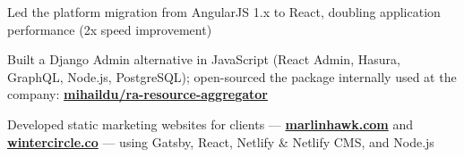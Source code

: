 \documentclass[]{plushcv}
\begin{document}
\begin{minipage}[t]{0.70\textwidth}
\begin{tightemize}
\sectionsep
\item Led the platform migration from AngularJS 1.x to React, doubling application performance (2x speed improvement)
\item Built a Django Admin alternative in JavaScript (React Admin, Hasura, GraphQL, Node.js, PostgreSQL); open-sourced the package internally used at the company: \href{https://github.com/mihaildu/ra-resource-aggregator}{\textbf{mihaildu/ra-resource-aggregator}}
\item Developed static marketing websites for clients — \href{https://www.marlinhawk.com/}{\textbf{marlinhawk.com}} and \href{https://www.wintercircle.co/}{\textbf{wintercircle.co}} — using Gatsby, React, Netlify \& Netlify CMS, and Node.js
\end{tightemize}
\sectionsep


%
%

\end{minipage} 
\hfill
\end{document}
